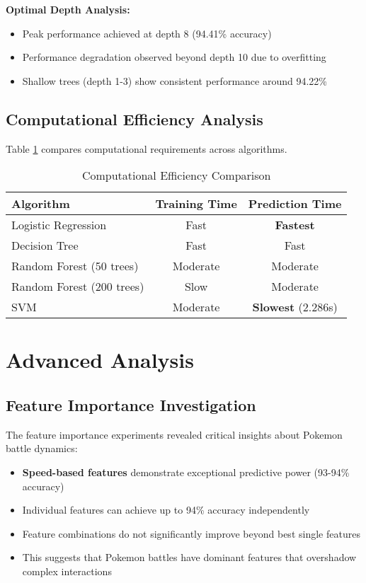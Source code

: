 \documentclass[12pt,a4paper]{article}
\begin{document}
\textbf{Optimal Depth Analysis:}
\begin{itemize}
    \item Peak performance achieved at depth 8 (94.41\% accuracy)
    \item Performance degradation observed beyond depth 10 due to overfitting
    \item Shallow trees (depth 1-3) show consistent performance around 94.22\%
\end{itemize}

\subsection{Computational Efficiency Analysis}

Table \ref{tab:efficiency} compares computational requirements across algorithms.

\begin{table}[H]
\centering
\caption{Computational Efficiency Comparison}
\label{tab:efficiency}
\begin{tabular}{lcc}
\toprule
\textbf{Algorithm} & \textbf{Training Time} & \textbf{Prediction Time} \\
\midrule
Logistic Regression & Fast & \textbf{Fastest} \\
Decision Tree & Fast & Fast \\
Random Forest (50 trees) & Moderate & Moderate \\
Random Forest (200 trees) & Slow & Moderate \\
SVM & Moderate & \textbf{Slowest} (2.286s) \\
\bottomrule
\end{tabular}
\end{table}

\section{Advanced Analysis}

\subsection{Feature Importance Investigation}

The feature importance experiments revealed critical insights about Pokemon battle dynamics:

\begin{itemize}
    \item \textbf{Speed-based features} demonstrate exceptional predictive power (93-94\% accuracy)
    \item Individual features can achieve up to 94\% accuracy independently
    \item Feature combinations do not significantly improve beyond best single features
    \item This suggests that Pokemon battles have dominant features that overshadow complex interactions
\end{itemize}
\end{document}
